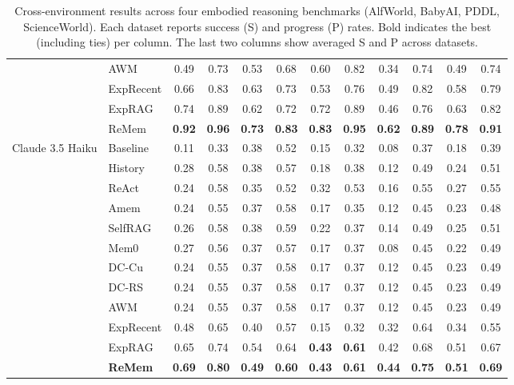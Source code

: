 \begin{table}[t!]
{\begin{tabular}{l l cc cc cc cc cc}
 & AWM & 0.49 & 0.73 & 0.53 & 0.68 & 0.60 & 0.82 & 0.34 & 0.74 & 0.49 & 0.74 \\
\cmidrule(lr){2-12}
 & ExpRecent & 0.66 & 0.83 & 0.63 & 0.73 & 0.53 & 0.76 & 0.49 & 0.82 & 0.58 & 0.79 \\
 & ExpRAG & 0.74 & 0.89 & 0.62 & 0.72 & 0.72 & 0.89 & 0.46 & 0.76 & 0.63 & 0.82 \\
 & ReMem & \textbf{0.92} & \textbf{0.96} & \textbf{0.73} & \textbf{0.83} & \textbf{0.83} & \textbf{0.95} & \textbf{0.62} & \textbf{0.89} & \textbf{0.78} & \textbf{0.91} \\
\midrule
\multirow{15}{*}{Claude 3.5 Haiku}
 & Baseline & 0.11 & 0.33 & 0.38 & 0.52 & 0.15 & 0.32 & 0.08 & 0.37 & 0.18 & 0.39 \\
 & History & 0.28 & 0.58 & 0.38 & 0.57 & 0.18 & 0.38 & 0.12 & 0.49 & 0.24 & 0.51 \\
\cmidrule(lr){2-12}
 & ReAct & 0.24 & 0.58 & 0.35 & 0.52 & 0.32 & 0.53 & 0.16 & 0.55 & 0.27 & 0.55 \\
 & Amem & 0.24 & 0.55 & 0.37 & 0.58 & 0.17 & 0.35 & 0.12 & 0.45 & 0.23 & 0.48 \\
\cmidrule(lr){2-12}
 & SelfRAG & 0.26 & 0.58 & 0.38 & 0.59 & 0.22 & 0.37 & 0.14 & 0.49 & 0.25 & 0.51 \\
 & Mem0 & 0.27 & 0.56 & 0.37 & 0.57 & 0.17 & 0.37 & 0.08 & 0.45 & 0.22 & 0.49 \\
\cmidrule(lr){2-12}
 & DC-Cu & 0.24 & 0.55 & 0.37 & 0.58 & 0.17 & 0.37 & 0.12 & 0.45 & 0.23 & 0.49 \\
 & DC-RS & 0.24 & 0.55 & 0.37 & 0.58 & 0.17 & 0.37 & 0.12 & 0.45 & 0.23 & 0.49 \\
 & AWM & 0.24 & 0.55 & 0.37 & 0.58 & 0.17 & 0.37 & 0.12 & 0.45 & 0.23 & 0.49 \\
\cmidrule(lr){2-12}
 & ExpRecent & 0.48 & 0.65 & 0.40 & 0.57 & 0.15 & 0.32 & 0.32 & 0.64 & 0.34 & 0.55 \\
 & ExpRAG & 0.65 & 0.74 & 0.54 & 0.64 & \textbf{0.43} & \textbf{0.61} & 0.42 & 0.68 & 0.51 & 0.67 \\
 & \textbf{ReMem} & \textbf{0.69} & \textbf{0.80} & \textbf{0.49} & \textbf{0.60} & \textbf{0.43} & \textbf{0.61} & \textbf{0.44} & \textbf{0.75} & \textbf{0.51} & \textbf{0.69} \\
\bottomrule
\end{tabular}}
\caption{Cross-environment results across four embodied reasoning benchmarks (AlfWorld, BabyAI, PDDL, ScienceWorld). Each dataset reports success (S) and progress (P) rates. Bold indicates the best (including ties) per column. The last two columns show averaged S and P across datasets.}
\label{tab:multi_full}
\end{table}
